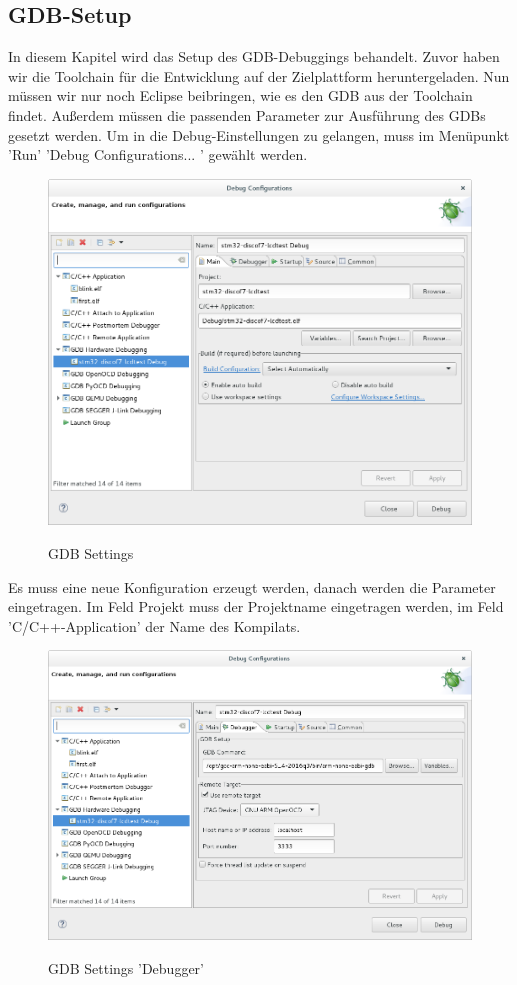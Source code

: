 \subsection{GDB-Setup}
In diesem Kapitel wird das Setup des GDB-Debuggings behandelt. Zuvor haben wir die Toolchain für die Entwicklung auf der Zielplattform heruntergeladen. Nun müssen wir nur noch Eclipse beibringen, wie es den GDB aus der Toolchain findet. Außerdem müssen die passenden Parameter zur Ausführung des GDBs gesetzt werden.
Um in die Debug-Einstellungen zu gelangen, muss im Menüpunkt 'Run' 'Debug Configurations... ' gewählt werden. 
\begin{figure}[h]
\begin{center}
\includegraphics[width=12cm]{grafiken/debugger/GDBsetting1.png}
\label{ecplipse_GDB_setting1}
\caption{GDB Settings}
\end{center}
\end{figure}
Es muss eine neue Konfiguration erzeugt werden, danach werden die Parameter eingetragen. Im Feld Projekt muss der Projektname eingetragen werden, im Feld 'C/C++-Application' der Name des Kompilats.
\begin{figure}[h]
\begin{center}
\includegraphics[width=12cm]{grafiken/debugger/GDBsetting2.png}
\label{ecplipse_GDB_setting2}
\caption{GDB Settings 'Debugger'}
\end{center}
\end{figure}
